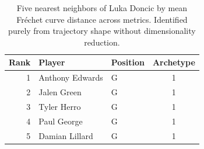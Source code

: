 \begin{table}[htbp]
  \centering\small
  \begin{tabular}{rllc}
    \toprule
    Rank & Player & Position & Archetype \\
    \midrule
    1 & Anthony Edwards & G & 1 \\
    2 & Jalen Green & G & 1 \\
    3 & Tyler Herro & G & 1 \\
    4 & Paul George & G & 1 \\
    5 & Damian Lillard & G & 1 \\
    \bottomrule
  \end{tabular}
  \caption{Five nearest neighbors of Luka Doncic by mean Fr\'{e}chet curve distance across metrics. Identified purely from trajectory shape without dimensionality reduction.}
  \label{tab:Luka_Doncic_frechet_curve_neighbors}
\end{table}

